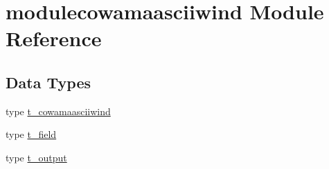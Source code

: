 \hypertarget{namespacemodulecowamaasciiwind}{}\section{modulecowamaasciiwind Module Reference}
\label{namespacemodulecowamaasciiwind}
\subsection*{Data Types}
\begin{DoxyCompactItemize}
\item 
type \mbox{\hyperlink{structmodulecowamaasciiwind_1_1t__cowamaasciiwind}{t\+\_\+cowamaasciiwind}}
\item 
type \mbox{\hyperlink{structmodulecowamaasciiwind_1_1t__field}{t\+\_\+field}}
\item 
type \mbox{\hyperlink{structmodulecowamaasciiwind_1_1t__output}{t\+\_\+output}}
\end{DoxyCompactItemize}
